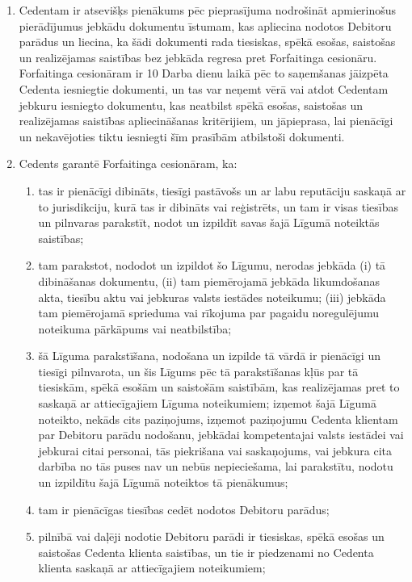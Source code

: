 \documentclass[a4paper]{article}
\begin{document}
\begin{multicols}{2}
\begin{enumerate}
  \item{Cedentam ir atsevišķs pienākums pēc pieprasījuma nodrošināt
apmierinošus pierādījumus jebkādu dokumentu īstumam, kas apliecina
nodotos Debitoru parādus un liecina, ka šādi dokumenti rada tiesiskas,
spēkā esošas, saistošas un realizējamas saistības bez jebkāda regresa
pret Forfaitinga cesionāru. Forfaitinga cesionāram ir 10 Darba dienu
laikā pēc to saņemšanas jāizpēta Cedenta iesniegtie dokumenti, un tas
var neņemt vērā vai atdot Cedentam jebkuru iesniegto dokumentu, kas
neatbilst spēkā esošas, saistošas un realizējamas saistības
apliecināšanas kritērijiem, un jāpieprasa, lai pienācīgi un nekavējoties
tiktu iesniegti šīm prasībām atbilstoši dokumenti.}

  \item{Cedents garantē Forfaitinga cesionāram, ka:}

    \begin{enumerate}

    \item{ tas ir pienācīgi dibināts, tiesīgi pastāvošs un ar labu
reputāciju saskaņā ar to jurisdikciju, kurā tas ir dibināts vai reģistrēts,
un tam ir visas tiesības un pilnvaras parakstīt, nodot un izpildīt savas
šajā Līgumā noteiktās saistības;}

    \item{tam parakstot, nododot un izpildot šo Līgumu, nerodas
jebkāda (i) tā dibināšanas dokumentu, (ii) tam piemērojamā jebkāda
likumdošanas akta, tiesību aktu vai jebkuras valsts iestādes noteikumu;
(iii) jebkāda tam piemērojamā sprieduma vai rīkojuma par pagaidu
noregulējumu noteikuma pārkāpums vai neatbilstība;}

    \item{šā Līguma parakstīšana, nodošana un izpilde tā vārdā ir
pienācīgi un tiesīgi pilnvarota, un šis Līgums pēc tā parakstīšanas kļūs
par tā tiesiskām, spēkā esošām un saistošām saistībām, kas
realizējamas pret to saskaņā ar attiecīgajiem Līguma noteikumiem;
izņemot šajā Līgumā noteikto, nekāds cits paziņojums, izņemot
paziņojumu Cedenta klientam par Debitoru parādu nodošanu, jebkādai
kompetentajai valsts iestādei vai jebkurai citai personai, tās piekrišana
vai saskaņojums, vai jebkura cita darbība no tās puses nav un nebūs
nepieciešama, lai parakstītu, nodotu un izpildītu šajā Līgumā noteiktos
tā pienākumus;}

    \item{ tam ir pienācīgas tiesības cedēt nodotos Debitoru parādus;}

    \item{pilnībā vai daļēji nodotie Debitoru parādi ir tiesiskas, spēkā
esošas un saistošas Cedenta klienta saistības, un tie ir piedzenami no
Cedenta klienta saskaņā ar attiecīgajiem noteikumiem;}


\end{enumerate}
\end{enumerate}
\end{multicols}
\end{document}
